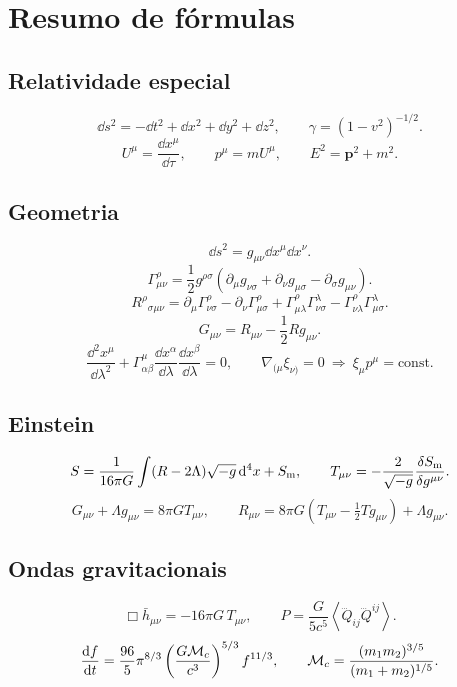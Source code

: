 \documentclass[12pt,a4paper,oneside]{book}
\theoremstyle{rgplain}
\theoremstyle{rgremark}
\begin{document}
\chapter{Resumo de fórmulas}

\section{Relatividade especial}
\[
  \dd s^2=-\dd t^2+\dd x^2+\dd y^2+\dd z^2,
  \qquad
  \gamma=(1-v^2)^{-1/2}.
\]
\[
  U^\mu=\frac{\dd x^\mu}{\dd\tau},
  \qquad
  p^\mu=mU^\mu,
  \qquad
  E^2=\bm p^2+m^2.
\]

\section{Geometria}
\[
  \dd s^2=g_{\mu\nu}\dd x^\mu\dd x^\nu.
\]
\[
  \Gamma^\rho_{\mu\nu}
  =\frac{1}{2}g^{\rho\sigma}
  (\partial_\mu g_{\nu\sigma}
  +\partial_\nu g_{\mu\sigma}
  -\partial_\sigma g_{\mu\nu}).
\]
\[
  R^\rho{}_{\sigma\mu\nu}
  =\partial_\mu\Gamma^\rho_{\nu\sigma}
  -\partial_\nu\Gamma^\rho_{\mu\sigma}
  +\Gamma^\rho_{\mu\lambda}\Gamma^\lambda_{\nu\sigma}
  -\Gamma^\rho_{\nu\lambda}\Gamma^\lambda_{\mu\sigma}.
\]
\[
  G_{\mu\nu}=R_{\mu\nu}-\frac{1}{2}Rg_{\mu\nu}.
\]
\[
  \frac{\dd^2x^\mu}{\dd\lambda^2}
  +\Gamma^\mu_{\alpha\beta}\frac{\dd x^\alpha}{\dd\lambda}
  \frac{\dd x^\beta}{\dd\lambda}=0,
  \qquad
  \nabla_{(\mu}\xi_{\nu)}=0
  \ \Rightarrow\ \xi_\mu p^\mu=\text{const.}
\]

\section{Einstein}
\[
  S=\frac{1}{16\pi G}\int (R-2\Lambda)\sqrt{-g}\,\mathrm{d}^4x+S_{\rm m},
  \qquad
  T_{\mu\nu}=-\frac{2}{\sqrt{-g}}\frac{\delta S_{\rm m}}{\delta g^{\mu\nu}}.
\]
\[
  G_{\mu\nu}+\Lambda g_{\mu\nu}=8\pi G T_{\mu\nu},
  \qquad
  R_{\mu\nu}=8\pi G\left(T_{\mu\nu}-\tfrac12 Tg_{\mu\nu}\right)
  +\Lambda g_{\mu\nu}.
\]

\section{Ondas gravitacionais}
\[
  \Box\bar h_{\mu\nu}=-16\pi G\,T_{\mu\nu},
  \qquad
  P=\frac{G}{5c^5}\left\langle\dddot Q_{ij}\dddot Q^{ij}\right\rangle .
\]
\[
  \frac{\mathrm{d} f}{\mathrm{d} t}=\frac{96}{5}\pi^{8/3}
  \left(\frac{G\mathcal{M}_c}{c^3}\right)^{5/3}f^{11/3},
  \qquad
  \mathcal{M}_c=\frac{(m_1m_2)^{3/5}}{(m_1+m_2)^{1/5}} .
\]
\end{document}
